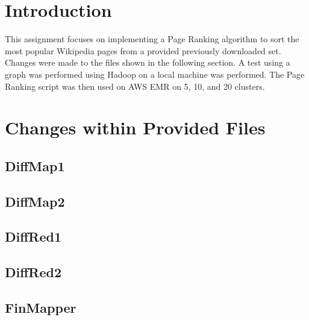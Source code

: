 \documentclass{homework}
\begin{document}
\maketitle

\section{Introduction}

This assignment focuses on implementing a Page Ranking algorithm to sort the most popular Wikipedia pages from a provided previously downloaded set. Changes were made to the files shown in the following section. A test using a graph was performed using Hadoop on a local machine was performed. The Page Ranking script was then used on AWS EMR on 5, 10, and 20 clusters. 

\newpage
\section{Changes within Provided Files}

\subsection{DiffMap1}


\newpage
\subsection{DiffMap2}


\newpage
\subsection{DiffRed1}


\newpage
\subsection{DiffRed2}


\newpage
\subsection{FinMapper}

\end{document}
